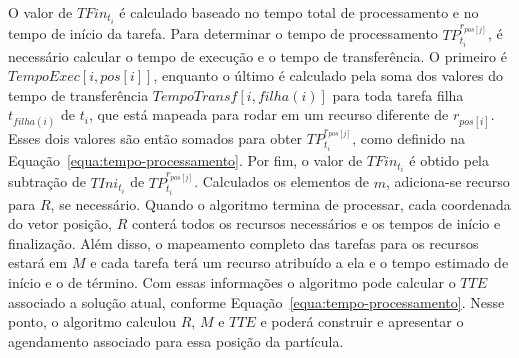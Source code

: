 O valor de $TFin_{t_i}$ é calculado baseado no tempo total de processamento e no tempo de início da tarefa. Para determinar o tempo de processamento $TP_{{t_i}}^{r_{pos[j]}}$, é necessário calcular o tempo de execução e o tempo de transferência. O primeiro é $TempoExec[i,pos[i]]$, enquanto o último é calculado pela soma dos valores do tempo de transferência $TempoTransf[i,filha(i)]$ para toda tarefa filha $t_{filha(i)}$ de ${t_i}$, que está mapeada para rodar em um recurso diferente de $r_{pos[i]}$. Esses dois valores são então somados para obter $TP_{{t_i}}^{r_{pos[j]}}$, como definido na Equação~\ref{equa:tempo-processamento}. Por fim, o valor de $TFin_{t_i}$ é obtido pela subtração de $TIni_{t_i}$ de $TP_{{t_i}}^{r_{pos[j]}}$.
Calculados os elementos de $ m $, adiciona-se recurso para $R$, se necessário. 
Quando o algoritmo termina de processar, cada coordenada do vetor posição, $R$ conterá todos os recursos necessários e os tempos de início e finalização. Além disso, o mapeamento completo das tarefas para os recursos estará em $M$ e cada tarefa terá um recurso atribuído a ela e o tempo estimado de início e o de término. Com essas informações o algoritmo pode calcular o $TTE$  associado a solução atual, conforme Equação~\ref{equa:tempo-processamento}. Nesse ponto, o algoritmo calculou $R$, $M$ e $TTE$ e poderá construir e apresentar o agendamento associado para essa posição da partícula.
